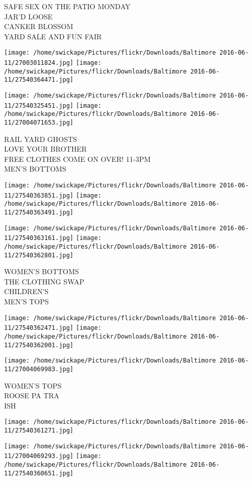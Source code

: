 \documentclass[10pt,letterpaper]{article}
\begin{document}
SAFE SEX ON THE PATIO MONDAY\\
JAR'D LOOSE\\
CANKER BLOSSOM\\
YARD SALE AND FUN FAIR
\pagebreak

\texttt{[image: /home/swickape/Pictures/flickr/Downloads/Baltimore 2016-06-11/27003011824.jpg]}
\texttt{[image: /home/swickape/Pictures/flickr/Downloads/Baltimore 2016-06-11/27540364471.jpg]}

\texttt{[image: /home/swickape/Pictures/flickr/Downloads/Baltimore 2016-06-11/27540325451.jpg]}
\texttt{[image: /home/swickape/Pictures/flickr/Downloads/Baltimore 2016-06-11/27004071653.jpg]}

RAIL YARD GHOSTS\\
LOVE YOUR BROTHER\\
FREE CLOTHES COME ON OVER!  11{-}3PM\\
MEN'S BOTTOMS
\pagebreak

\texttt{[image: /home/swickape/Pictures/flickr/Downloads/Baltimore 2016-06-11/27540363851.jpg]}
\texttt{[image: /home/swickape/Pictures/flickr/Downloads/Baltimore 2016-06-11/27540363491.jpg]}

\texttt{[image: /home/swickape/Pictures/flickr/Downloads/Baltimore 2016-06-11/27540363161.jpg]}
\texttt{[image: /home/swickape/Pictures/flickr/Downloads/Baltimore 2016-06-11/27540362801.jpg]}

WOMEN'S BOTTOMS\\
THE CLOTHING SWAP\\
CHILDREN'S\\
MEN'S TOPS
\pagebreak

\texttt{[image: /home/swickape/Pictures/flickr/Downloads/Baltimore 2016-06-11/27540362471.jpg]}
\texttt{[image: /home/swickape/Pictures/flickr/Downloads/Baltimore 2016-06-11/27540362001.jpg]}

\texttt{[image: /home/swickape/Pictures/flickr/Downloads/Baltimore 2016-06-11/27004069983.jpg]}

WOMEN'S TOPS\\
ROOSE PA TRA\\
ISH
\pagebreak

\texttt{[image: /home/swickape/Pictures/flickr/Downloads/Baltimore 2016-06-11/27540361271.jpg]}

\vspace{0.25in}
\texttt{[image: /home/swickape/Pictures/flickr/Downloads/Baltimore 2016-06-11/27004069293.jpg]}
\texttt{[image: /home/swickape/Pictures/flickr/Downloads/Baltimore 2016-06-11/27540360651.jpg]}
\end{document}
